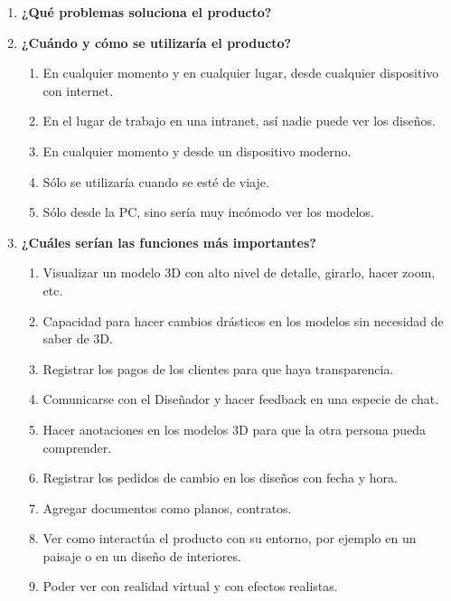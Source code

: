 \begin{enumerate}
\item{\textbf{¿Qué problemas soluciona el producto?}}
    \item{\textbf{¿Cuándo y cómo se utilizaría el producto?}}
    \begin{enumerate}
        \item En cualquier momento y en cualquier lugar, desde cualquier dispositivo con internet. 
        \item En el lugar de trabajo en una intranet, así nadie puede ver los diseños.
        \item En cualquier momento y desde un dispositivo moderno.
        \item Sólo se utilizaría cuando se esté de viaje.
        \item Sólo desde la PC, sino sería muy incómodo ver los modelos.
    \end{enumerate}


    \item{\textbf{¿Cuáles serían las funciones más importantes?}}
    \begin{enumerate}
        \item Visualizar un modelo 3D con alto nivel de detalle, girarlo, hacer zoom, etc.
        \item Capacidad para hacer cambios drásticos en los modelos sin necesidad de saber de 3D.
        \item Registrar los pagos de los clientes para que haya transparencia.
        \item Comunicarse con el Diseñador y hacer feedback en una especie de chat.
        \item Hacer anotaciones en los modelos 3D para que la otra persona pueda comprender. 
        \item Registrar los pedidos de cambio en los diseños con fecha y hora.
        \item Agregar documentos como planos, contratos.
        \item Ver como interactúa el producto con su entorno, por ejemplo en un paisaje o en un diseño de interiores.
        \item Poder ver con realidad virtual y con efectos realistas.
    \end{enumerate}


\end{enumerate}

